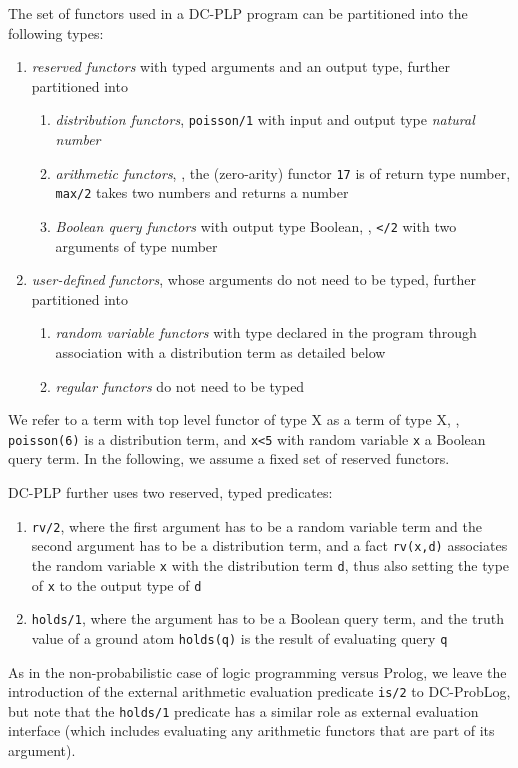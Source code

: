The set of functors used in a DC-PLP program can be partitioned into the following types:
\begin{enumerate}
\item \emph{reserved functors} with typed arguments and an output type, further partitioned into 
\begin{enumerate}
    \item \emph{distribution functors}, \eg \verb|poisson/1| with input and output type \emph{natural number}
    \item \emph{arithmetic functors}, \eg, the (zero-arity) functor \verb|17| is of return type number, \verb|max/2| takes two numbers and returns a number
    \item \emph{Boolean query functors} with output type Boolean, \eg, \verb|</2| with two arguments of type number
\end{enumerate}
\item \emph{user-defined functors}, whose arguments do not need to be typed, further partitioned into
\begin{enumerate}
\item \emph{random variable functors} with type declared  in the program through association with a distribution term as detailed below
    \item \emph{regular functors} do not need to be typed
\end{enumerate}
\end{enumerate}
We refer to a term with top level functor of type X as a term of type X, \eg, \verb|poisson(6)| is a distribution term, and \verb|x<5| with random variable \verb|x| a Boolean query term. 
In the following, we assume a fixed set of reserved functors.

DC-PLP further uses two reserved, typed predicates:
\begin{enumerate}
    \item \verb|rv/2|, where the  first argument has to be a random variable term and the second argument has to be a distribution term, and a fact \verb|rv(x,d)| associates the random variable \verb|x| with the distribution term \verb|d|, thus also setting the type of \verb|x| to the output type of \verb|d|
    \item \verb|holds/1|, where the argument has to be a Boolean query term, and the truth value of a ground atom \verb|holds(q)| is the result of evaluating query \verb|q|
\end{enumerate}
As in the non-probabilistic case of logic programming versus Prolog, we leave the introduction of the external arithmetic evaluation predicate \verb|is/2| to DC-ProbLog, but note that the \verb|holds/1| predicate has a similar role as external evaluation interface (which includes evaluating any arithmetic functors that are part of its argument). 


